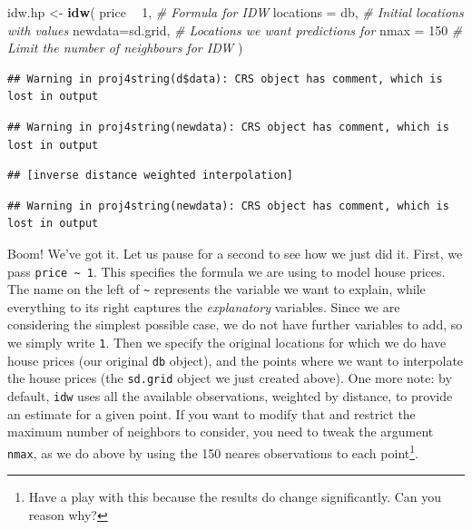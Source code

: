\documentclass[
]{book}
\newenvironment{Shaded}{\begin{snugshade}}{\end{snugshade}}
\newcommand{\CommentTok}[1]{\textcolor[rgb]{0.56,0.35,0.01}{\textit{#1}}}
\newcommand{\DataTypeTok}[1]{\textcolor[rgb]{0.13,0.29,0.53}{#1}}
\newcommand{\DecValTok}[1]{\textcolor[rgb]{0.00,0.00,0.81}{#1}}
\newcommand{\KeywordTok}[1]{\textcolor[rgb]{0.13,0.29,0.53}{\textbf{#1}}}
\newcommand{\NormalTok}[1]{#1}
\newcommand{\OperatorTok}[1]{\textcolor[rgb]{0.81,0.36,0.00}{\textbf{#1}}}
\newcommand{\StringTok}[1]{\textcolor[rgb]{0.31,0.60,0.02}{#1}}
\begin{document}
\begin{Shaded}
\begin{Highlighting}[]
\NormalTok{idw.hp <-}\StringTok{ }\KeywordTok{idw}\NormalTok{(}
\NormalTok{  price }\OperatorTok{~}\StringTok{ }\DecValTok{1}\NormalTok{,         }\CommentTok{# Formula for IDW}
  \DataTypeTok{locations =}\NormalTok{ db,    }\CommentTok{# Initial locations with values}
  \DataTypeTok{newdata=}\NormalTok{sd.grid,   }\CommentTok{# Locations we want predictions for}
  \DataTypeTok{nmax =} \DecValTok{150}         \CommentTok{# Limit the number of neighbours for IDW}
\NormalTok{)}
\end{Highlighting}
\end{Shaded}

\begin{verbatim}
## Warning in proj4string(d$data): CRS object has comment, which is lost in output
\end{verbatim}

\begin{verbatim}
## Warning in proj4string(newdata): CRS object has comment, which is lost in output
\end{verbatim}

\begin{verbatim}
## [inverse distance weighted interpolation]
\end{verbatim}

\begin{verbatim}
## Warning in proj4string(newdata): CRS object has comment, which is lost in output
\end{verbatim}

Boom! We've got it. Let us pause for a second to see how we just did it. First, we pass \texttt{price\ \textasciitilde{}\ 1}. This specifies the formula we are using to model house prices. The name on the left of \texttt{\textasciitilde{}} represents the variable we want to explain, while everything to its right captures the \emph{explanatory} variables. Since we are considering the simplest possible case, we do not have further variables to add, so we simply write \texttt{1}. Then we specify the original locations for which we do have house prices (our original \texttt{db} object), and the points where we want to interpolate the house prices (the \texttt{sd.grid} object we just created above). One more note: by default, \texttt{idw} uses all the available observations, weighted by distance, to provide an estimate for a given point. If you want to modify that and restrict the maximum number of neighbors to consider, you need to tweak the argument \texttt{nmax}, as we do above by using the 150 neares observations to each point\footnote{Have a play with this because the results do change significantly. Can you reason why?}.
\end{document}
